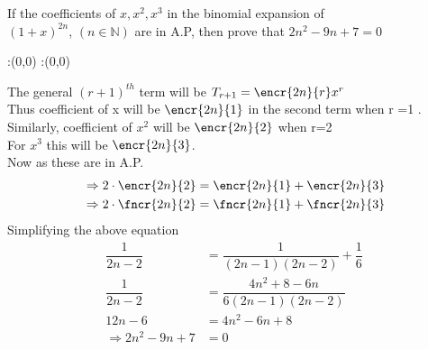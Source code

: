 



\question If the coefficients of $x, x^{2}, x^{3}$ in the binomial expansion of \\ $(1+x)^{2n}$, $(n\in \mathbb{N})$ are in A.P, then prove that $2n^{2} -9n +7 =0$


\watchout

\ifprintanswers
  \begin{marginfigure}
      :(0,0)
      :(0,0)
    \figdrawbegin{}
      \figdrawline [100,101]
    \figdrawend
    \figvisu{\figBoxA}{}{%
    }
    \centerline{\box\figBoxA}
  \end{marginfigure}
\fi 

\begin{solution}
The general $(r+1)^{th}$ term will be $T_{r+1} = \encr{2n}{r} x^{r} $ \\
Thus coefficient of x will be $\encr{2n}{1}$ in the second term when r =1 . \\
Similarly, coefficient of $x^{2}$ will be $\encr{2n}{2}$ when r=2 \\
For $x^{3}$ this will be $\encr{2n}{3}$. \\
Now as these are in A.P.
\begin{align}
&\Rightarrow 2\cdot \encr{2n}{2} = \encr{2n}{1}+\encr{2n}{3} \\
&\Rightarrow 2\cdot \fncr{2n}{2} = \fncr{2n}{1}+\fncr{2n}{3} \\
\end{align}   
Simplifying the above equation \\
\begin{align}
\dfrac{1}{2n-2} &= \dfrac{1}{(2n-1)(2n-2)} + \dfrac{1}{6}\\
\dfrac{1}{2n-2} &= \dfrac{4n^{2} + 8 - 6n}{6(2n-1)(2n-2)}\\
12n - 6 &= 4n^{2} - 6n + 8\\
\Rightarrow  2n^2 - 9n + 7 &= 0
\end{align}
\end{solution}

